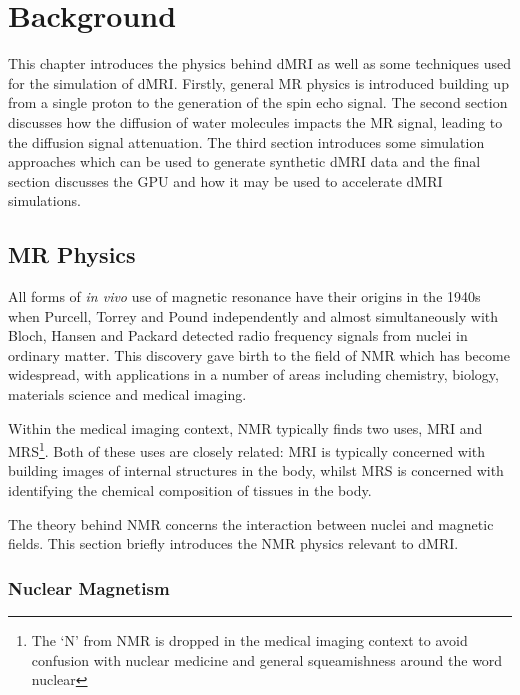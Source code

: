 \renewcommand{\BrainFuckChapter}{y}
\renewcommand{\LifeChapter}{y}
\chapter{Background}
\label{sec:background}
\chaptertoc{}

\begin{chapterabstract}
  This chapter introduces the physics behind \ac{dMRI} as well as some techniques used for the simulation of \ac{dMRI}.
  Firstly, general MR physics is introduced building up from a single proton to the generation of the spin echo signal.
  The second section discusses how the diffusion of water molecules impacts the MR signal, leading to the diffusion signal attenuation.
  The third section introduces some simulation approaches which can be used to generate synthetic \ac{dMRI} data and the final section discusses the \ac{GPU} and how it may be used to accelerate \ac{dMRI} simulations. 
\end{chapterabstract}

\section{MR Physics}
\label{sec:bg_mri_physics}
All forms of \emph{in vivo} use of magnetic resonance have their origins in the 1940s when Purcell, Torrey and Pound independently and almost simultaneously with Bloch, Hansen and Packard detected radio frequency signals from nuclei in ordinary matter\cite{Levitt2008, Barker2009,Bloch1946,Purcell1946}.
This discovery gave birth to the field of \ac{NMR} which has become widespread, with applications in a number of areas including chemistry, biology, materials science and medical imaging\cite{Barker2009, Salibi1998}.

Within the medical imaging context, \ac{NMR} typically finds two uses, \acf{MRI} and \ac{MRS}\footnote{The `N' from NMR is dropped in the medical imaging context to avoid confusion with nuclear medicine and general squeamishness around the word nuclear}.
Both of these uses are closely related: \ac{MRI} is typically concerned with building images of internal structures in the body, whilst \ac{MRS} is concerned with identifying the chemical composition of tissues in the body.

The theory behind \ac{NMR} concerns the interaction between nuclei and magnetic fields. This section briefly introduces the \ac{NMR} physics relevant to \ac{dMRI}.

\subsection{Nuclear Magnetism}
\label{sec:bg_nuclearmagnetism}

